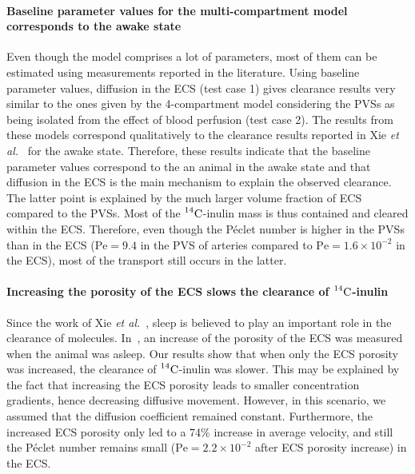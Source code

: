 \documentclass[10pt]{article}
\newcommand{\etal}{\emph{et al.}\;}
\newcommand{\1}{^{(1)}}
\newcommand{\2}{^{(2)}}
\newcommand{\Cinulin}{$\prescript{14}{}{\text{C}}$-inulin }
\begin{document}
\paragraph{Baseline parameter values for the multi-compartment model corresponds to the awake state}
Even though the model comprises a lot of parameters, most of them can be estimated using measurements reported in the literature. Using baseline parameter values, diffusion in the ECS (test case 1) gives clearance results very similar to the ones given by the 4-compartment model considering the PVSs as being isolated from the effect of blood perfusion (test case 2). The results from these models correspond qualitatively to the clearance results reported in Xie \etal~\cite{Xie_2013_sleep} for the awake state. Therefore, these results indicate that the baseline parameter values correspond to the an animal in the awake state and that diffusion in the ECS is the main mechanism to explain the observed clearance. The latter point is explained by the much larger volume fraction of ECS compared to the PVSs. Most of the \Cinulin mass is thus contained and cleared within the ECS. Therefore, even though the P\'eclet number is higher in the PVSs than in the ECS ($\text{Pe}=9.4$ in the PVS of arteries compared to $\text{Pe} = 1.6\times 10^{-2}$ in the ECS), most of the transport still occurs in the latter.

\paragraph{Increasing the porosity of the ECS slows the clearance of \Cinulin}

Since the work of Xie \etal~\cite{Xie_2013_sleep}, sleep is believed to play an important role in the clearance of molecules. In~\cite{Xie_2013_sleep}, an increase of the porosity of the ECS was measured when the animal was asleep. 
Our results show that when only the ECS porosity was increased, the clearance of \Cinulin was slower. This may be explained by the fact that increasing the ECS porosity leads to smaller concentration gradients, hence decreasing diffusive movement. However, in this scenario, we assumed that the diffusion coefficient remained constant. 
Furthermore, the increased ECS porosity only led to a 74\% increase in average velocity, and still the P\'eclet number remains small ($\text{Pe} = 2.2 \times 10^{-2}$ after ECS porosity increase) in the ECS.
\end{document}
